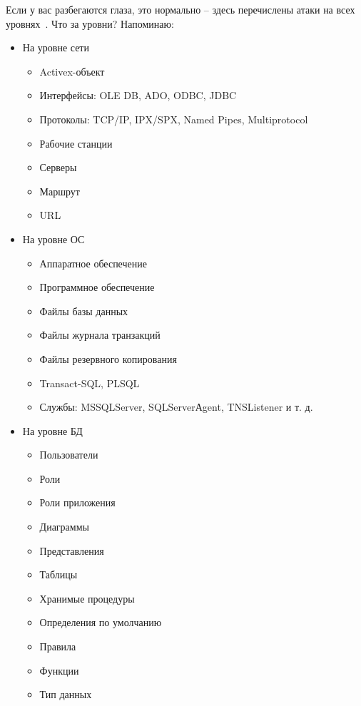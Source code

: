 Если у вас разбегаются глаза, это нормально -- здесь перечислены атаки на всех уровнях~\label{pon:urovs}. Что за уровни? Напоминаю:
\begin{itemize}
	\item На уровне сети
	\begin{itemize}
		\item Activex-объект
		\item Интерфейсы: OLE DB, ADO, ODBC, JDBC
		\item Протоколы: TCP/IP, IPX/SPX, Named Pipes, Multiprotocol
		\item Рабочие станции
		\item Серверы
		\item Маршрут
		\item URL
	\end{itemize}
	\item На уровне ОС
	\begin{itemize}
		\item Аппаратное обеспечение
		\item Программное обеспечение
		\item Файлы базы данных
		\item Файлы журнала транзакций
		\item Файлы резервного копирования
		\item Transact-SQL, PLSQL
		\item Службы: MSSQLServer, SQLServerАgent, TNSListener и т. д.
	\end{itemize}
	\item На уровне БД
	\begin{itemize}
		\item Пользователи
		\item Роли
		\item Роли приложения
		\item Диаграммы
		\item Представления
		\item Таблицы
		\item Хранимые процедуры
		\item Определения по умолчанию
		\item Правила
		\item Функции
		\item Тип данных
	\end{itemize}
\end{itemize}

